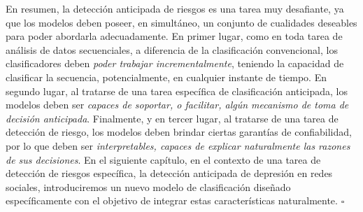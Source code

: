 En resumen, la detección anticipada de riesgos es una tarea muy desafiante, ya que los modelos deben poseer, en simultáneo, un conjunto de cualidades deseables para poder abordarla adecuadamente.
En primer lugar, como en toda tarea de análisis de datos secuenciales, a diferencia de la clasificación convencional, los clasificadores deben \emph{poder trabajar incrementalmente}, teniendo la capacidad de clasificar la secuencia, potencialmente, en cualquier instante de tiempo. En segundo lugar, al tratarse de una tarea específica de clasificación anticipada, los modelos deben ser \emph{capaces de soportar, o facilitar, algún mecanismo de toma de decisión anticipada}.
Finalmente, y en tercer lugar, al tratarse de una tarea de detección de riesgo, los modelos deben brindar ciertas garantías de confiabilidad, por lo que deben ser \emph{interpretables, capaces de explicar naturalmente las razones de sus decisiones}.
En el siguiente capítulo, en el contexto de una tarea de detección de riesgos específica, la detección anticipada de depresión en redes sociales, introduciremos un nuevo modelo de clasificación diseñado específicamente con el objetivo de integrar estas características naturalmente.
\hfill$\square$